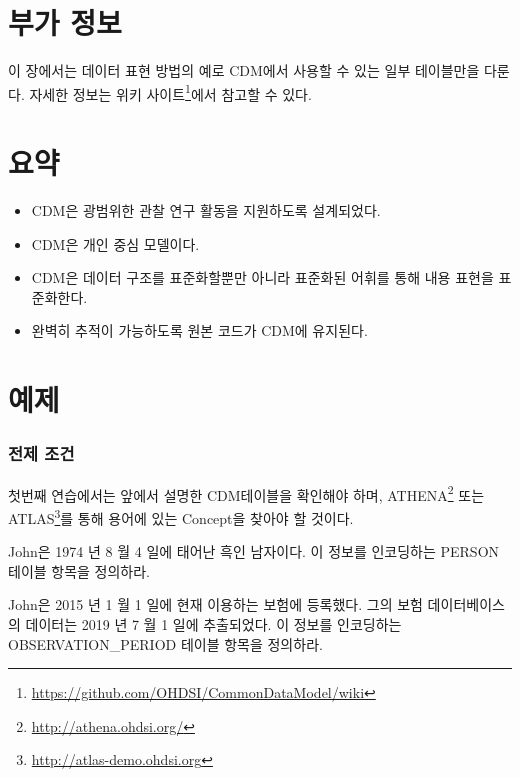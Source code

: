\documentclass[11pt]{book}
\let\rmarkdownfootnote\footnote%
\def\footnote{\protect\rmarkdownfootnote}
\theoremstyle{definition}
\theoremstyle{definition}
\theoremstyle{definition}
\theoremstyle{remark}
\let\BeginKnitrBlock\begin \let\EndKnitrBlock\end
\begin{document}
\section{부가 정보}\label{-}

이 장에서는 데이터 표현 방법의 예로 CDM에서 사용할 수 있는 일부
테이블만을 다룬다. 자세한 정보는 위키 사이트\footnote{\url{https://github.com/OHDSI/CommonDataModel/wiki}}에서
참고할 수 있다.

\section{요약}\label{-2}

\BeginKnitrBlock{rmdsummary}
\begin{itemize}
\item
  CDM은 광범위한 관찰 연구 활동을 지원하도록 설계되었다.
\item
  CDM은 개인 중심 모델이다.
\item
  CDM은 데이터 구조를 표준화할뿐만 아니라 표준화된 어휘를 통해 내용
  표현을 표준화한다.
\item
  완벽히 추적이 가능하도록 원본 코드가 CDM에 유지된다.
\end{itemize}
\EndKnitrBlock{rmdsummary}

\section{예제}

\subsubsection*{전제 조건}\label{-}

첫번째 연습에서는 앞에서 설명한 CDM테이블을 확인해야 하며,
ATHENA\footnote{\url{http://athena.ohdsi.org/}} 또는 ATLAS\footnote{\url{http://atlas-demo.ohdsi.org}}를
통해 용어에 있는 Concept을 찾아야 할 것이다.

\BeginKnitrBlock{exercise}
\protect\hypertarget{exr:exerciseJohnPerson}{}{\label{exr:exerciseJohnPerson}
}John은 1974 년 8 월 4 일에 태어난 흑인 남자이다. 이 정보를 인코딩하는
PERSON 테이블 항목을 정의하라.
\EndKnitrBlock{exercise}

\BeginKnitrBlock{exercise}
\protect\hypertarget{exr:exerciseJohnOp}{}{\label{exr:exerciseJohnOp}
}John은 2015 년 1 월 1 일에 현재 이용하는 보험에 등록했다. 그의 보험
데이터베이스의 데이터는 2019 년 7 월 1 일에 추출되었다. 이 정보를
인코딩하는 OBSERVATION\_PERIOD 테이블 항목을 정의하라.
\EndKnitrBlock{exercise}
\end{document}
